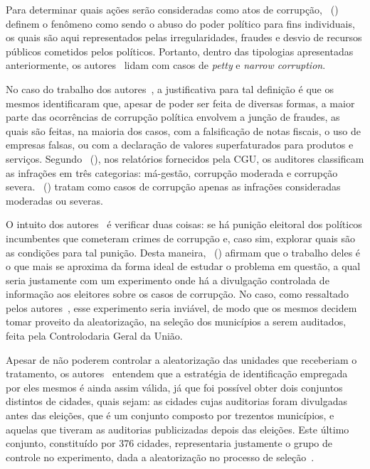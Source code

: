 \documentclass[
	12pt,				%
	openright,			%
	twoside,			%
	a4paper,			%
	openany,
	english,			%
	brazil				%
	]{abntex2}
\begin{document}
Para determinar quais ações serão consideradas como atos de corrupção, ~(\citeyear{ferraz2008exposing}) definem o fenômeno como sendo o abuso do poder político para fins individuais, os quais são aqui representados pelas irregularidades, fraudes e desvio de recursos públicos cometidos pelos políticos. Portanto, dentro das tipologias apresentadas anteriormente, os autores~\cite{ferraz2008exposing} lidam com casos de \textit{petty} e \textit{narrow corruption}.

No caso do trabalho dos autores~\cite{ferraz2008exposing}, a justificativa para tal definição é que os mesmos identificaram que, apesar de poder ser feita de diversas formas, a maior parte das ocorrências de corrupção política envolvem a junção de fraudes, as quais são feitas, na maioria dos casos, com a falsificação de notas fiscais, o uso de empresas falsas, ou com a declaração de valores superfaturados para produtos e serviços. Segundo ~(\citeyear{Avis2018Oct}), nos relatórios fornecidos pela CGU, os auditores classificam as infrações em três categorias: má-gestão, corrupção moderada e corrupção severa. ~(\citeyear{ferraz2008exposing}) tratam como casos de corrupção apenas as infrações consideradas moderadas ou severas.

O intuito dos autores~\cite{ferraz2008exposing} é verificar duas coisas: se há punição eleitoral dos políticos incumbentes que cometeram crimes de corrupção e, caso sim, explorar quais são as condições para tal punição. Desta maneira, ~(\citeyear{ferraz2008exposing}) afirmam que o trabalho deles é o que mais se aproxima da forma ideal de estudar o problema em questão, a qual seria justamente com um experimento onde há a divulgação controlada de informação aos eleitores sobre os casos de corrupção. No caso, como ressaltado pelos autores~\cite{ferraz2008exposing}, esse experimento seria inviável, de modo que os mesmos decidem tomar proveito da aleatorização, na seleção dos municípios a serem auditados, feita pela Controlodaria Geral da União.

Apesar de não poderem controlar a aleatorização das unidades que receberiam o tratamento, os autores~\cite{ferraz2008exposing} entendem que a estratégia de identificação empregada por eles mesmos é ainda assim válida, já que foi possível obter dois conjuntos distintos de cidades, quais sejam: as cidades cujas auditorias foram divulgadas antes das eleições, que é um conjunto composto por trezentos municípios, e aquelas que tiveram as auditorias publicizadas depois das eleições. Este último conjunto, constituído por 376 cidades, representaria justamente o grupo de controle no experimento, dada a aleatorização no processo de seleção~\cite{ferraz2008exposing}.
\end{document}
